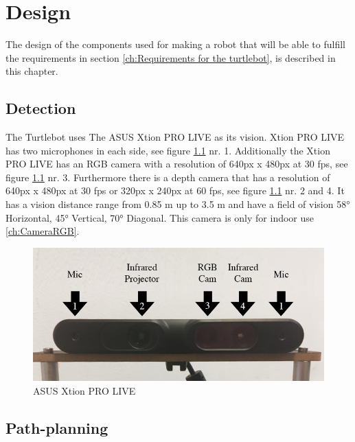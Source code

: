 \chapter{Design}
\label{ch:design}
The design of the components used for making a robot that will be able to fulfill the requirements in section \ref{ch:Requirements for the turtlebot}, is described in this chapter.

%
% 
%
%
\section{Detection} 
The Turtlebot uses The ASUS Xtion PRO LIVE as its vision. Xtion PRO LIVE has two microphones in each side, see figure \ref{fig:asusCamera} nr. 1. Additionally the Xtion PRO LIVE has an RGB camera with a resolution of 640px x 480px at 30 fps, see figure \ref{fig:asusCamera} nr. 3. Furthermore there is a depth camera that has a resolution of 640px x 480px at 30 fps or 320px x 240px at 60 fps, see figure \ref{fig:asusCamera} nr. 2 and 4.
It has a vision distance range from 0.85 m up to 3.5 m and have a field of vision 58° Horizontal, 45° Vertical, 70° Diagonal.
This camera is only for indoor use \ref{ch:CameraRGB}.
\begin{figure}[h]
    \centering
    \includegraphics[width=\textwidth]{figures/camera02.png}
    \caption{ASUS Xtion PRO LIVE} 
    \label{fig:asusCamera} 
\end{figure}


%
%
%
%
\section{Path-planning}


